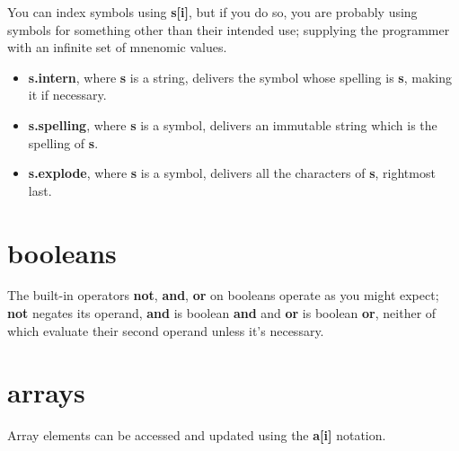 \documentclass{report}
\begin{document}
You can index symbols using {\bf s{[}i{]}}, but if you do so, you are probably
using symbols for something other than their intended use; supplying
the programmer with an infinite set of mnenomic values.

\begin{itemize}\item {\bf s.intern}, where {\bf s} is a string, delivers the symbol whose spelling
is {\bf s}, making it if necessary.

\item {\bf s.spelling}, where {\bf s} is a symbol, delivers an immutable string which
is the spelling of {\bf s}.

\item {\bf s.explode}, where {\bf s} is a symbol, delivers all the characters of {\bf s},
rightmost last.

\end{itemize}\section{booleans}


The built-in operators {\bf not}, {\bf and}, {\bf or} on booleans operate as you
might expect; {\bf not} negates its operand, {\bf and} is boolean {\bf and} and
{\bf or} is boolean {\bf or}, neither of which evaluate their second operand
unless it's necessary.\section{arrays}


Array elements can be accessed and updated using the {\bf a{[}i{]}} notation.
\end{document}
